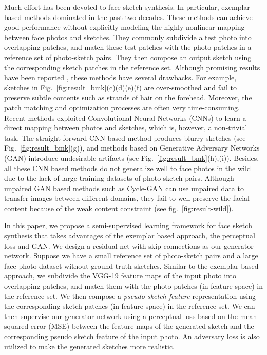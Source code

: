 \documentclass[runningheads]{llncs}
\begin{document}
Much effort has been devoted to face sketch synthesis. In particular, exemplar based methods dominated in the past two decades. These methods can achieve good performance without explicitly modeling the highly nonlinear mapping between face photos and sketches. They commonly subdivide a test photo into overlapping patches, and match these test patches with the photo patches in a reference set of photo-sketch pairs. They then compose an output sketch using the corresponding sketch patches in the reference set. Although promising results have been reported \cite{song2014real,zhou2012markov,ijcai2017-500,wang2009face}, these methods have several drawbacks. For example, sketches in Fig.~\ref{fig:result_bmk}(c)(d)(e)(f) are over-smoothed and fail to preserve subtle contents such as strands of hair on the forehead. Moreover, the patch matching and optimization processes are often very time-consuming. Recent methods exploited Convolutional Neural Networks (CNNs) to learn a direct mapping between photos and sketches, which is, however, a non-trivial task. The straight forward CNN based method produces blurry sketches (see Fig.~\ref{fig:result_bmk}(g)), and methods based on Generative Adversary Networks (GAN) \cite{goodfellow2014generative} introduce undesirable artifacts (see Fig.~\ref{fig:result_bmk}(h),(i)). Besides, all these CNN based methods do not generalize well to face photos in the wild due to the lack of large training datasets of photo-sketch pairs. Although unpaired GAN based methods such as Cycle-GAN \cite{CycleGAN2017} can use unpaired data to transfer images between different domains, they fail to well preserve the facial content because of the weak content constraint (see fig.~\ref{fig:result-wild}).

In this paper, we propose a semi-supervised learning framework for face sketch synthesis that takes advantages of the exemplar based approach, the perceptual loss and GAN. We design a residual net \cite{He2015} with skip connections as our generator network. Suppose we have a small reference set of photo-sketch pairs and a large face photo dataset without ground truth sketches. Similar to the exemplar based approach, we subdivide the VGG-19 \cite{simonyan2014very} feature maps of the input photo into overlapping patches, and match them with the photo patches (in feature space) in the reference set. We then compose a {\em pseudo sketch feature} representation using the corresponding sketch patches (in feature space) in the reference set.  We can then supervise our generator network using a perceptual loss based on the mean squared error (MSE) between the feature maps of the generated sketch and the corresponding pseudo sketch feature of the input photo. An adversary loss is also utilized to make the generated sketches more realistic.
\end{document}
